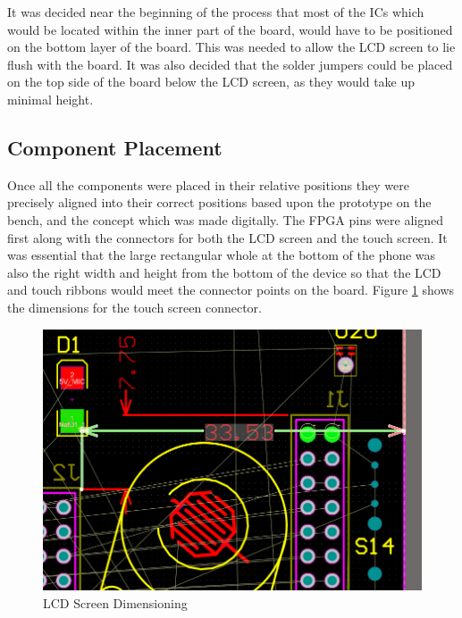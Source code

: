 	It was decided near the beginning of the process that most of the ICs which would be located within the inner part of the board, would have to be positioned on the bottom layer of the board. This was needed to allow the LCD screen to lie flush with the board. It was also decided that the solder jumpers could be placed on the top side of the board below the LCD screen, as they would take up minimal height.\\

\subsection{Component Placement}
	Once all the components were placed in their relative positions they were precisely aligned into their correct positions based upon the prototype on the bench, and the concept which was made digitally. The FPGA pins were aligned first along with the connectors for both the LCD screen and the touch screen. It was essential that the large rectangular whole at the bottom of the phone was also the right width and height from the bottom of the device so that the LCD and touch ribbons would meet the connector points on the board. Figure \ref{fig:component_placement} shows the dimensions for the touch screen connector. 

\begin{figure}
	\includegraphics[width=\linewidth]{Figures/component_placement.png}\centering
	\caption{LCD Screen Dimensioning}
	\label{fig:component_placement}
\end{figure}


